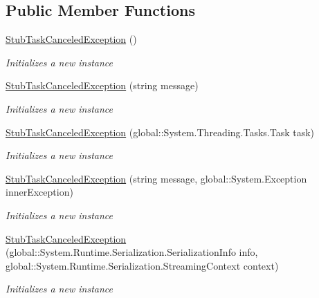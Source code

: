 \subsection*{Public Member Functions}
\begin{DoxyCompactItemize}
\item 
\hyperlink{class_system_1_1_threading_1_1_tasks_1_1_fakes_1_1_stub_task_canceled_exception_aba6c7887082993d8b7526b5aed8ac879}{Stub\-Task\-Canceled\-Exception} ()
\begin{DoxyCompactList}\small\item\em Initializes a new instance\end{DoxyCompactList}\item 
\hyperlink{class_system_1_1_threading_1_1_tasks_1_1_fakes_1_1_stub_task_canceled_exception_a37cc22a8fe0d1983bff191b9642134fa}{Stub\-Task\-Canceled\-Exception} (string message)
\begin{DoxyCompactList}\small\item\em Initializes a new instance\end{DoxyCompactList}\item 
\hyperlink{class_system_1_1_threading_1_1_tasks_1_1_fakes_1_1_stub_task_canceled_exception_aa2ab7bed8c8cc3e8c53bdaa9874f4b60}{Stub\-Task\-Canceled\-Exception} (global\-::\-System.\-Threading.\-Tasks.\-Task task)
\begin{DoxyCompactList}\small\item\em Initializes a new instance\end{DoxyCompactList}\item 
\hyperlink{class_system_1_1_threading_1_1_tasks_1_1_fakes_1_1_stub_task_canceled_exception_af005a33a959d5a099c7f83a882e2e202}{Stub\-Task\-Canceled\-Exception} (string message, global\-::\-System.\-Exception inner\-Exception)
\begin{DoxyCompactList}\small\item\em Initializes a new instance\end{DoxyCompactList}\item 
\hyperlink{class_system_1_1_threading_1_1_tasks_1_1_fakes_1_1_stub_task_canceled_exception_afe248f02d4dd1d0b30555825cf826b3a}{Stub\-Task\-Canceled\-Exception} (global\-::\-System.\-Runtime.\-Serialization.\-Serialization\-Info info, global\-::\-System.\-Runtime.\-Serialization.\-Streaming\-Context context)
\begin{DoxyCompactList}\small\item\em Initializes a new instance\end{DoxyCompactList}\item 

\end{DoxyCompactItemize}
